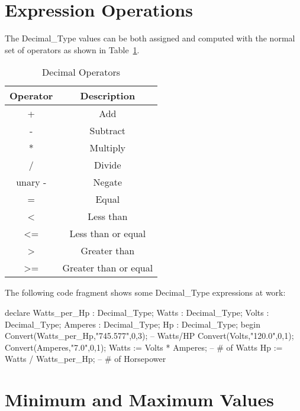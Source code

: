 \documentclass[english,letterpaper]{book}
\begin{document}
\section{Expression Operations}

The Decimal\_Type values can be both assigned and computed with the
normal set of operators as shown in Table~\ref{t:decopr}.

\begin{table}
   \begin{center}
      \begin{tabular}{|c|c|}
         \hline 
         Operator             &  Description\\
         \hline
         +                    &  Add\\
         -                    &  Subtract\\
         {*}                  &  Multiply\\
         /                    &  Divide\\
         unary -              &  Negate\\
         =                    &  Equal\\
         <                    &  Less than\\
         <=                   &  Less than or equal\\
         >                    &  Greater than\\
         >=                   &  Greater than or equal\\
         \hline
      \end{tabular}
   \end{center}
   \caption{Decimal Operators}\label{t:decopr}
\end{table}

The following code fragment shows some Decimal\_Type expressions
at work:

\begin{Example}
declare
   Watts_per_Hp : Decimal_Type; 
   Watts :        Decimal_Type;
   Volts :        Decimal_Type;
   Amperes :      Decimal_Type;
   Hp :           Decimal_Type;
begin
   Convert(Watts_per_Hp,"745.577",0,3); -- Watts/HP
   Convert(Volts,"120.0",0,1);
   Convert(Amperes,"7.0",0,1);
   Watts := Volts * Amperes;       -- # of Watts
   Hp := Watts / Watts_per_Hp;     -- # of Horsepower
\end{Example}

\section{Minimum and Maximum Values}
\end{document}
